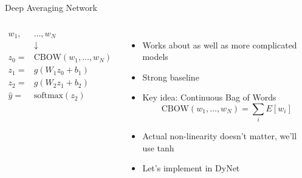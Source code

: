 \documentclass[compress]{beamer}
\begin{document}
\begin{frame}[fragile]{Deep Averaging Network}

\begin{columns}

  \begin{align*}
    w_1, &\dots, w_N \\
    & \downarrow \\
    z_0 = & \mbox{CBOW}(w_1, \dots, w_N) \\
    z_1 = & g(W_1 z_0 + b_1) \\
    z_2 = & g(W_2 z_1 + b_2) \\
    \hat y = & \mbox{softmax}(z_2)
  \end{align*}


    \begin{itemize}
      \item Works about as well as more complicated models
      \item Strong baseline
      \item Key idea: Continuous Bag of Words
        \begin{equation}
          \mbox{CBOW}(w_1, \dots, w_N) = \sum_i E[w_i]
        \end{equation}
      \item Actual non-linearity doesn't matter, we'll use tanh
      \item Let's implement in DyNet
    \end{itemize}

\end{columns}
\end{frame}
\end{document}
